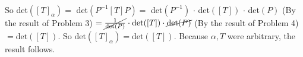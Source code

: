 \documentclass[12pt]{article}
\newenvironment{problem}[2][Problem]
{
	\begin{trivlist} 
		\item[\hskip \labelsep {\bfseries #1 #2:}]
	}
{
	\end{trivlist}
	}
\newenvironment{solution}[1][Solution]
{
	\begin{trivlist} 
		\item[\hskip \labelsep {\itshape #1:}]
	}
	{
	\end{trivlist}
}
\begin{document}
\begin{problem}{5}
\begin{solution}
\begin{align*}
\end{align*}
So det$([T]_{\alpha})=$ det$(P^{-1} [T] P) =$ det$(P^{-1})$ $\cdot$ det$([T])$ $\cdot$ det$(P)$ (By the result of Problem 3) $=\cancel{\frac{1}{\text{det}(P)}} \cdot \text{det}([T]) \cdot \cancel{\text{det}(P)}$ (By the result of Problem 4) $= \text{det}([T])$. So $\text{det}([T]_{\alpha})=\text{det}([T])$. Because $\alpha, T$ were arbitrary, the result follows.
\end{solution}
\end{problem}
\end{document}
